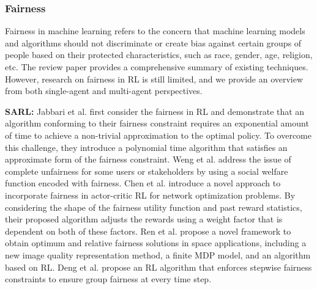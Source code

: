 \documentclass[acmsmall]{acmart}
\begin{document}
\subsubsection{Fairness}

Fairness in machine learning refers to the concern that machine learning models and algorithms should not discriminate or create bias against certain groups of people based on their protected characteristics, such as race, gender, age, religion, etc. The review paper \cite{10.1145/3494672} provides a comprehensive summary of existing techniques. However, research on fairness in RL is still limited, and we provide an overview from both single-agent and multi-agent perspectives. %

\textbf{SARL: }  Jabbari et al.\cite{pmlr-v70-jabbari17a} first consider the fairness in RL and demonstrate that an algorithm conforming to their fairness constraint requires an exponential amount of time to achieve a non-trivial approximation to the optimal policy. To overcome this challenge, they introduce a polynomial time algorithm that satisfies an approximate form of the fairness constraint.
Weng et al. \cite{weng2019fairness}  address the issue of complete unfairness for some users or stakeholders by using a social welfare function encoded with fairness. 
Chen et al. \cite{9488823} introduce a novel approach to incorporate fairness in actor-critic RL for network optimization problems. By considering the shape of the fairness utility function and past reward statistics, their proposed algorithm adjusts the rewards using a weight factor that is dependent on both of these factors.
Ren et al. \cite{xx2022108242} propose a novel framework to obtain optimum and relative fairness solutions in space applications, including a new image quality representation method, a finite MDP model, and an algorithm based on RL. 
Deng et al. \cite{deng2022reinforcement} propose an RL algorithm that enforces stepwise fairness constraints to ensure group fairness at every time step.
\end{document}
